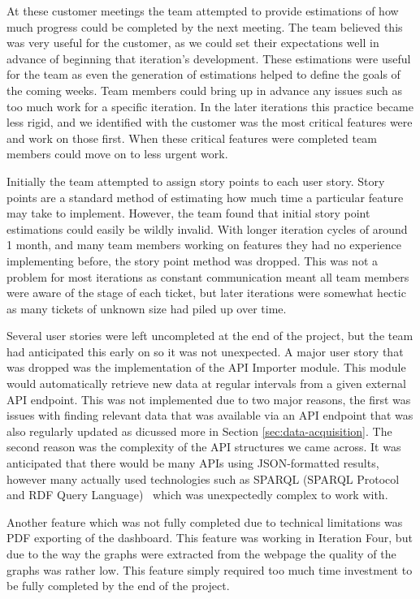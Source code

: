 \documentclass{l3proj}
\begin{document}
At these customer meetings the team attempted to provide estimations of how much progress could be completed by the next meeting. The team believed this was very useful for the customer, as we could set their expectations well in advance of beginning that iteration's development. These estimations were useful for the team as even the generation of estimations helped to define the goals of the coming weeks. Team members could bring up in advance any issues such as too much work for a specific iteration. In the later iterations this practice became less rigid, and we identified with the customer was the most critical features were and work on those first. When these critical features were completed team members could move on to less urgent work.

Initially the team attempted to assign story points to each user story. Story points are a standard method of estimating how much time a particular feature may take to implement. However, the team found that initial story point estimations could easily be wildly invalid. With longer iteration cycles of around 1 month, and many team members working on features they had no experience implementing before, the story point method was dropped. This was not a problem for most iterations as constant communication meant all team members were aware of the stage of each ticket, but later iterations were somewhat hectic as many tickets of unknown size had piled up over time.

Several user stories were left uncompleted at the end of the project, but the team had anticipated this early on so it was not unexpected. A major user story that was dropped was the implementation of the API Importer module. This module would automatically retrieve new data at regular intervals from a given external API endpoint. This was not implemented due to two major reasons, the first was issues with finding relevant data that was available via an API endpoint that was also regularly updated as dicussed more in Section \ref{sec:data-acquisition}. The second reason was the complexity of the API structures we came across. It was anticipated that there would be many APIs using JSON-formatted results, however many actually used technologies such as SPARQL (SPARQL Protocol and RDF Query Language)~\cite{W3SPARQL} which was unexpectedly complex to work with.

Another feature which was not fully completed due to technical limitations was PDF exporting of the dashboard. This feature was working in Iteration Four, but due to the way the graphs were extracted from the webpage the quality of the graphs was rather low. This feature simply required too much time investment to be fully completed by the end of the project.
\end{document}
